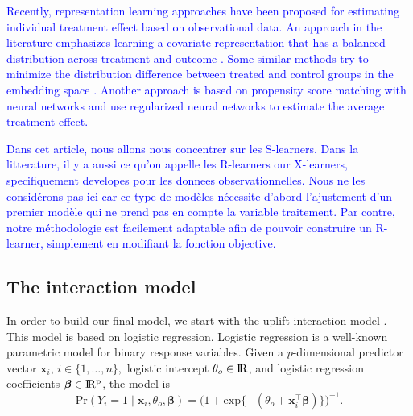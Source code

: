 \documentclass{article}
\def\bbeta{\boldsymbol \beta}
\def \real{\rm I\!R}
\begin{document}
\textcolor{blue}{Recently, representation learning approaches have been proposed for estimating individual treatment effect based on observational data. An approach in the literature emphasizes learning a covariate representation that has a balanced distribution across treatment and outcome \citep{johansson2016learning}. Some similar methods try to minimize the distribution difference between treated and control groups in the embedding space \citep{shalit2017estimating, yao2018representation}. Another approach is based on propensity score matching \citep{rosenbaum1983central} with neural networks \citep{alaa2017deep, schwab2018perfect} and \citep{shi2019adapting} use regularized neural networks to estimate the average treatment effect.}


\textcolor{blue}{Dans cet article, nous allons nous concentrer sur les S-learners. Dans la litterature, il y a aussi ce qu'on appelle les R-learners our X-learners, specifiquement developes pour les donnees observationnelles. Nous ne les considérons pas ici car ce type de modèles nécessite d'abord l'ajustement d'un premier modèle qui ne prend pas en compte la variable traitement. Par contre, notre méthodologie est facilement adaptable afin de pouvoir construire un R-learner, simplement en modifiant la fonction objective.}

\subsection{The interaction model}

In order to build our final model, we start with the uplift interaction model \citep{lo2002true}. This model is based on logistic regression. Logistic regression is a well-known parametric model for binary response variables. Given a $p$-dimensional predictor vector $\textbf{x}_i$, $i \in \{1,\ldots,n\},$ logistic intercept $\theta_o \in \real$, and logistic regression coefficients $\bbeta \in \real^p$, 
the model is
\begin{equation*} 
     \mathrm{Pr}(Y_i=1 \mid \textbf{x}_i, \theta_o, \bbeta) = \bigl(1 + \mathrm{exp}\{- (\theta_o + \textbf{x}_i^{\top} \bbeta) \} \bigr)^{-1}.
\end{equation*}
\end{document}

